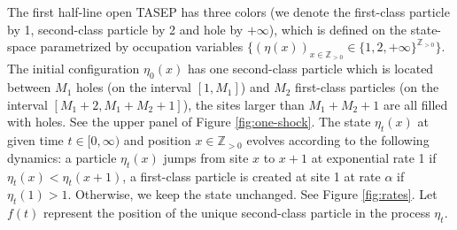 \documentclass[12pt,a4paper]{amsart}
\theoremstyle{remark}
\numberwithin{equation}{section} \numberwithin{theorem}{section}
\begin{document}
The first half-line open TASEP has three colors (we denote the first-class particle by 1, second-class particle by 2 and hole by $+\infty$), which is defined on the state-space parametrized by occupation variables $\{(\eta(x))_{x\in\mathbb{Z}_{> 0}} \in \{1,2,+\infty\}^{\mathbb{Z}_{> 0}}\}$. The initial configuration $\eta_{0}(x)$ has one second-class particle which is located between $M_1$ holes (on the  interval $[1, M_1]$) and $M_2$ first-class particles (on the interval $[M_1+2, M_1+M_2+1]$), the sites larger than $M_1+M_2+1$ are all filled with holes. See the upper panel of Figure \ref{fig:one-shock}. The state $\eta_{t}(x)$ at given time $t\in[0,\infty)$ and position $x\in\mathbb{Z}_{> 0}$ evolves according to the following dynamics: a particle $\eta_{t}(x)$ jumps from site $x$ to $x+1$ at exponential rate 1 if $\eta_{t}(x)<\eta_{t}(x+1)$, a first-class particle is created at site 1 at rate $\alpha$ if $\eta_{t}(1)>1$. Otherwise, we keep the state unchanged. See Figure \ref{fig:rates}. Let $f(t)$ represent the position of the unique second-class particle in the process $\eta_{t}$.
\end{document}
